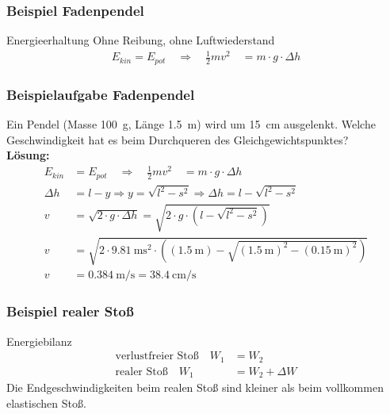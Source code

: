 \documentclass{article}
\begin{document}
\frame
{
  \frametitle{Beispiel Fadenpendel}
  \begin{block}{Energieerhaltung}
  Ohne Reibung, ohne Luftwiederstand
	\begin{align*}
	E_{kin}=E_{pot}\quad\Rightarrow\quad \frac{1}{2}mv^2\quad=m\cdot g\cdot \Delta h
	\end{align*}
  \end{block}
}

\frame
{
  \frametitle{Beispielaufgabe Fadenpendel}
{
  Ein Pendel (Masse \SI{100}{\gram}, Länge \SI{1.5}{\meter}) wird um \SI{15}{\centi\meter} ausgelenkt. Welche Geschwindigkeit hat es beim Durchqueren des Gleichgewichtspunktes?\\
}
{
\textbf{Lösung:}	\begin{align*}
	E_{kin}&=E_{pot}\quad\Rightarrow\quad \frac{1}{2}mv^2\quad=m\cdot g\cdot \Delta h\\
	\Delta h&=l-y\Rightarrow y=\sqrt{l^2-s^2}\Rightarrow \Delta h=l-\sqrt{l^2-s^2}\\
	v&=\sqrt{2\cdot g\cdot \Delta h}=\sqrt{2\cdot g \cdot \left( l-\sqrt{l^2-s^2}\right)}\\
	v&=\sqrt{2\cdot \SI{9,81}{\meter\square\second} \cdot \left( (\SI{1.5}{\meter})-\sqrt{(\SI{1.5}{\meter})^2-(\SI{0.15}{\meter})^2}\right)}\\
	v&=\SI{0,384}{\meter\per\second}=\SI{38,4}{\centi\meter\per\second}
	\end{align*}
}
}

\frame
{
  \frametitle{Beispiel realer Stoß}
  \begin{block}{Energiebilanz}
	\begin{align*}
	\text{verlustfreier Stoß}
	\quad W_1&=W_2\\
	\text{realer Stoß}
	\quad W_1&=W_2+\Delta W
	\end{align*}
	Die Endgeschwindigkeiten beim realen Stoß sind kleiner als beim vollkommen elastischen Stoß.
  \end{block}
}
\end{document}
